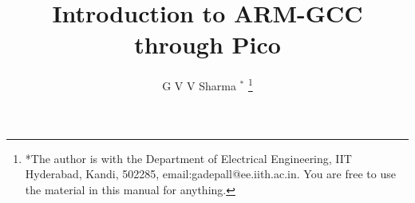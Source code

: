 \documentclass[journal,12pt,twocolumn]{IEEEtran}
\renewcommand\thesection{\arabic{section}}
\begin{document}
\let\StandardTheFigure\thefigure
\let\vec\mathbf
\renewcommand{\thefigure}{\thesection}



\def\putbox#1#2#3{\makebox[0in][l]{\makebox[#1][l]{}\raisebox{\baselineskip}[0in][0in]{\raisebox{#2}[0in][0in]{#3}}}}
     \def\rightbox#1{\makebox[0in][r]{#1}}
     \def\centbox#1{\makebox[0in]{#1}}
     \def\topbox#1{\raisebox{-\baselineskip}[0in][0in]{#1}}
     \def\midbox#1{\raisebox{-0.5\baselineskip}[0in][0in]{#1}}

\vspace{3cm}

\title{
Introduction to ARM-GCC through Pico
}
\author{ G V V Sharma $^{*}$%
	\thanks{*The author is with the Department of Electrical Engineering, IIT Hyderabad, Kandi, 502285, 
email:gadepall@ee.iith.ac.in. You are free to use the material in this manual for anything.}
	
}	
%	


%
%
%
\end{document}
